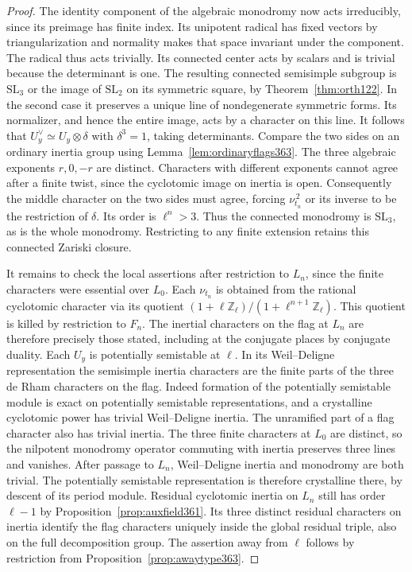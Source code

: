 \documentclass[a4paper,11pt]{article}
\theoremstyle{definition}
\theoremstyle{remark}
\newcommand{\ZZ}{\mathbb Z}\newcommand{\ord}{\operatorname{ord}}
\numberwithin{equation}{section}
\begin{document}
\begin{proof}
The identity component of the algebraic monodromy now acts
irreducibly, since its preimage has finite index. Its unipotent
radical has fixed vectors by triangularization and normality
makes that space invariant under the component. The radical
thus acts trivially. Its connected center acts by scalars and
is trivial because the determinant is one. The resulting
connected semisimple subgroup is \(\mathrm{SL}_3\) or the
image of \(\mathrm{SL}_2\) on its symmetric square, by
Theorem~\ref{thm:orth122}. In the second case it preserves a
unique line of nondegenerate symmetric forms. Its normalizer,
and hence the entire image, acts by a character on this line.
It follows that \(U_y^\vee\simeq U_y\otimes\delta\) with
\(\delta^3=1\), taking determinants. Compare the two sides on
an ordinary inertia group using Lemma~\ref{lem:ordinaryflags363}.
The three algebraic exponents \(r,0,-r\) are distinct.
Characters with different exponents cannot agree after a
finite twist, since the cyclotomic image on inertia is open.
Consequently the middle character on the two sides must
agree, forcing \(\nu_{t_n}^{\,2}\) or its inverse to be
the restriction of \(\delta\). Its order is \(\ell^n>3\).
Thus the connected monodromy is \(\mathrm{SL}_3\), as is the
whole monodromy. Restricting to any finite extension retains
this connected Zariski closure.

It remains to check the local assertions after restriction to
\(L_n\), since the finite characters were essential over
\(L_0\). Each \(\nu_{t_n}\) is obtained from the rational
cyclotomic character via its quotient
\((1+\ell\ZZ_\ell)/(1+\ell^{n+1}\ZZ_\ell)\). This quotient
is killed by restriction to \(F_n\). The inertial characters
on the flag at \(L_n\) are therefore precisely those stated,
including at the conjugate places by conjugate duality.
Each \(U_y\) is potentially semistable at \(\ell\).
In its Weil--Deligne representation the semisimple inertia
characters are the finite parts of the three de Rham
characters on the flag. Indeed formation of the potentially
semistable module is exact on potentially semistable
representations, and a crystalline cyclotomic power has trivial
Weil--Deligne inertia. The unramified part of a flag character
also has trivial inertia. The three finite characters at \(L_0\)
are distinct, so the nilpotent monodromy operator commuting
with inertia preserves three lines and vanishes. After passage
to \(L_n\), Weil--Deligne inertia and monodromy are both
trivial. The potentially semistable representation is therefore
crystalline there, by descent of its period module. Residual
cyclotomic inertia on \(L_n\) still has order \(\ell-1\) by
Proposition~\ref{prop:auxfield361}. Its three distinct residual
characters on inertia identify the flag characters uniquely
inside the global residual triple, also on the full
decomposition group. The assertion away from \(\ell\) follows by
restriction from Proposition~\ref{prop:awaytype363}.


\end{proof}
\end{document}

